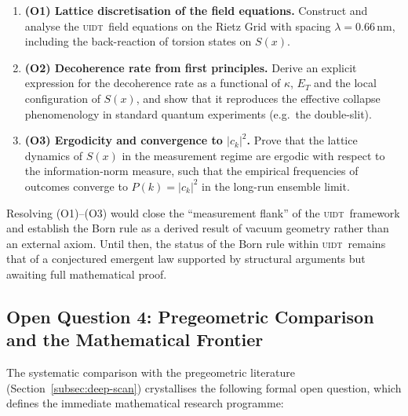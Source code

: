 \documentclass[12pt,a4paper,twoside]{article}
\theoremstyle{plain}
\theoremstyle{definition}
\theoremstyle{remark}
\newcommand{\UIDT}{\textsc{uidt}}
\begin{document}
\begin{enumerate}
  \item \textbf{(O1) Lattice discretisation of the field equations.}
  Construct and analyse the \UIDT\ field equations on the Rietz Grid with
  spacing $\lambda = 0.66\,\mathrm{nm}$, including the back-reaction of
  torsion states on $S(x)$.

  \item \textbf{(O2) Decoherence rate from first principles.}
  Derive an explicit expression for the decoherence rate as a functional
  of $\kappa$, $E_T$ and the local configuration of $S(x)$, and show that
  it reproduces the effective collapse phenomenology in standard quantum
  experiments (e.g.\ the double-slit).

  \item \textbf{(O3) Ergodicity and convergence to $|c_k|^2$.}
  Prove that the lattice dynamics of $S(x)$ in the measurement regime are
  ergodic with respect to the information-norm measure, such that the
  empirical frequencies of outcomes converge to $P(k) = |c_k|^2$ in the
  long-run ensemble limit.
\end{enumerate}

Resolving (O1)--(O3) would close the ``measurement flank'' of the \UIDT\
framework and establish the Born rule as a derived result of vacuum geometry
rather than an external axiom. Until then, the status of the Born rule within
\UIDT\ remains that of a conjectured emergent law supported by structural
arguments but awaiting full mathematical proof.

\newpage
\subsection{Open Question 4: Pregeometric Comparison and the Mathematical Frontier}
\label{subsec:open-question-4}

The systematic comparison with the pregeometric literature
(Section~\ref{subsec:deep-scan}) crystallises the following formal open
question, which defines the immediate mathematical research programme:
\end{document}
